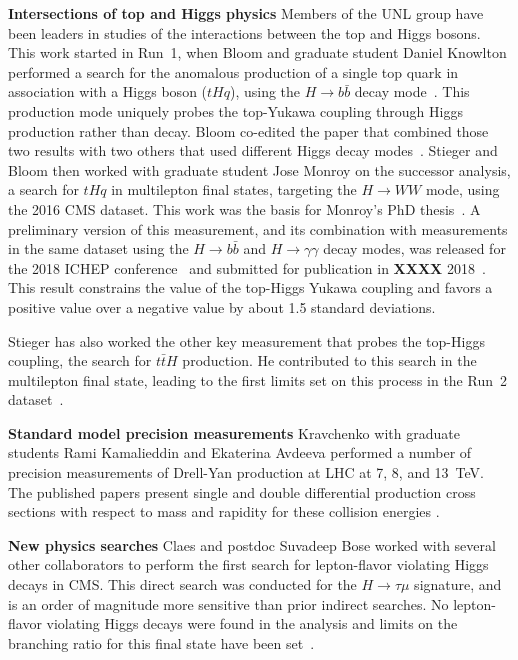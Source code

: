 {\bf Intersections of top and Higgs physics} Members of the UNL group have been leaders in studies of the interactions between the top and Higgs bosons.  This work started in Run~1, when Bloom and graduate student Daniel Knowlton performed a search for the anomalous production of a single top quark in association with a Higgs boson ($tHq$), using the $H \to b\bar{b}$ decay mode~\cite{bib:tHqbbPAS}.  This production mode uniquely probes the top-Yukawa coupling through Higgs production rather than decay.  Bloom co-edited the paper that combined those two results with two others that used different Higgs decay modes~\cite{bib:tHqRun1}.  Stieger and Bloom then worked with graduate student Jose Monroy on the successor analysis, a search for $tHq$ in multilepton final states, targeting the $H \to WW$ mode, using the 2016 CMS dataset.  This work was the basis for Monroy's PhD thesis~\cite{bib:monroy_thesis}.  A preliminary version of this measurement, and its combination with measurements in the same dataset using the $H\to b\bar{b}$ and $H \to \gamma\gamma$ decay modes, was released for the 2018 ICHEP conference~\cite{bib:tHqRun2PAS} and submitted for publication in {\bf XXXX} 2018~\cite{bib:tHqRun2}.  This result constrains the value of the top-Higgs Yukawa coupling and favors a positive value over a negative value by about 1.5 standard deviations.

Stieger has also worked the other key measurement that probes the top-Higgs
coupling, the search for $t\bar{t}H$ production.  He contributed to
this search in the multilepton final state, leading to the first limits set
on this process in the Run~2 dataset~\cite{bib:ttHmultilep}.

{\bf Standard model precision measurements} Kravchenko with graduate students Rami Kamalieddin and Ekaterina Avdeeva performed a number of precision measurements of Drell-Yan production at LHC at 7, 8, and 13~TeV. The published papers present single and double differential production cross sections with respect to mass and rapidity for these collision energies \cite{bib:DY7,bib:DY8,bib:DY13}.

{\bf New physics searches}
Claes and postdoc Suvadeep Bose worked with several other collaborators to perform the first search for lepton-flavor violating Higgs decays in CMS. This direct search was conducted for the $H\rightarrow \tau\mu$ signature, and is an order of magnitude more sensitive than prior indirect searches. No lepton-flavor violating Higgs decays were found in the analysis and limits on the branching ratio for this final state have been set~\cite{bib:higgs-LFV}.

